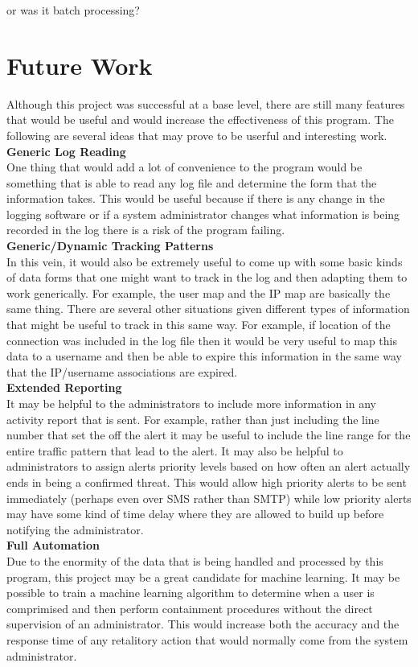 \documentclass[12pt]{report}
\begin{document}
	or was it batch processing?


\section*{Future Work}
	Although this project was successful at a base level, there are still many 
	features that would be useful and would increase the effectiveness of this
	program. The following are several ideas that may prove to be userful and 
	interesting work. \\

	\noindent
	\textbf{Generic Log Reading} \\
	One thing that would add a lot of convenience to the program would 
	be something that is able to read any log file and determine the form that 
	the information takes. This would be useful because if there is any change 
	in the logging software or if a system administrator changes what information 
	is being recorded in the log there is a risk of the program failing. \\

	\noindent
	\textbf{Generic/Dynamic Tracking Patterns} \\
	In this vein, it would also be extremely useful to come up with some basic kinds of 
	data forms that one might want to track in the log and then adapting them to 
	work generically. For example, the user map and the IP map are basically the
	same thing. There are several other situations given different types of 
	information that might be useful to track in this same way. For example, if
	location of the connection was included in the log file then it would be very
	useful to map this data to a username and then be able to expire this information
	in the same way that the IP/username associations are expired. \\

	\noindent
	\textbf{Extended Reporting} \\
	It may be helpful to the administrators to include more information
	in any activity report that is sent. For example, rather than just including
	the line number that set the off the alert it may be useful to include the 
	line range for the entire traffic pattern that lead to the alert. It may also
	be helpful to administrators to assign alerts priority levels based on how 
	often an alert actually ends in being a confirmed threat. This would allow
	high priority alerts to be sent immediately (perhaps even over SMS rather than
	SMTP) while low priority alerts may have some kind of time delay where they
	are allowed to build up before notifying the administrator. \\

	\noindent
	\textbf{Full Automation} \\
	Due to the enormity of the data that is being handled and processed by this
	program, this project may be a great candidate for machine learning. It may
	be possible to train a machine learning algorithm to determine when a user
	is comprimised and then perform containment procedures without the direct 
	supervision of an administrator. This would increase both the accuracy and
	the response time of any retalitory action that would normally come from
	the system administrator. \\
\end{document}

